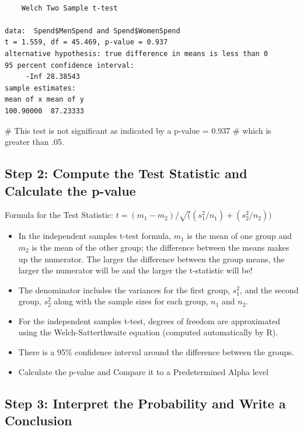 \documentclass[
  letterpaper,
  DIV=11,
  numbers=noendperiod]{scrreprt}
\newenvironment{Shaded}{\begin{snugshade}}{\end{snugshade}}
\newcommand{\CommentTok}[1]{\textcolor[rgb]{0.37,0.37,0.37}{#1}}
\begin{document}
\begin{verbatim}

    Welch Two Sample t-test

data:  Spend$MenSpend and Spend$WomenSpend
t = 1.559, df = 45.469, p-value = 0.937
alternative hypothesis: true difference in means is less than 0
95 percent confidence interval:
     -Inf 28.38543
sample estimates:
mean of x mean of y 
100.90000  87.23333 
\end{verbatim}

\begin{Shaded}
\begin{Highlighting}[]
\CommentTok{\# This test is not significant as indicated by a p{-}value = 0.937}
\CommentTok{\# which is greater than .05.}
\end{Highlighting}
\end{Shaded}

\subsection{Step 2: Compute the Test Statistic and Calculate the
p-value}\label{step-2-compute-the-test-statistic-and-calculate-the-p-value}

Formula for the Test Statistic:
\(t = (m_1 - m_2)/\sqrt((s^2_1/n_1)+(s^2_2/n_2))\)

\begin{itemize}
\item
  In the independent samples t-test formula, \(m_1\) is the mean of one
  group and \(m_2\) is the mean of the other group; the difference
  between the means makes up the numerator. The larger the difference
  between the group means, the larger the numerator will be and the
  larger the t-statistic will be!
\item
  The denominator includes the variances for the first group, \(s^2_1\),
  and the second group, \(s^2_2\) along with the sample sizes for each
  group, \(n_1\) and \(n_2\).
\item
  For the independent samples t-test, degrees of freedom are
  approximated using the Welch-Satterthwaite equation (computed
  automatically by R).
\item
  There is a 95\% confidence interval around the difference between the
  groups.
\item
  Calculate the p-value and Compare it to a Predetermined Alpha level
\end{itemize}

\subsection{Step 3: Interpret the Probability and Write a
Conclusion}\label{step-3-interpret-the-probability-and-write-a-conclusion}
\end{document}
